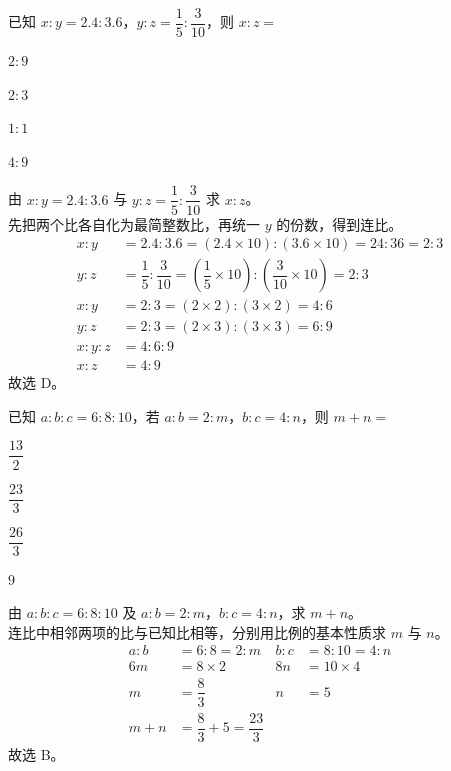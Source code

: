 \documentclass[12pt,a4paper,fontset=none]{exam-zh}
\begin{document}
\begin{question}
    已知 $x:y=2.4:3.6$，$y:z=\dfrac{1}{5}:\dfrac{3}{10}$，则 $x:z=$ \paren[D]
    \begin{choices}
        \item $2:9$
        \item $2:3$
        \item $1:1$
        \item $4:9$
    \end{choices}
\end{question}

\begin{solution}
    由 $x:y=2.4:3.6$ 与 $y:z=\dfrac{1}{5}:\dfrac{3}{10}$ 求 $x:z$。 \\
    先把两个比各自化为最简整数比，再统一 $y$ 的份数，得到连比。
    \begin{align*}
        x:y &= 2.4:3.6 = (2.4\times 10):(3.6\times 10) = 24:36 = 2:3 \\
        y:z &= \dfrac{1}{5}:\dfrac{3}{10} = \left(\dfrac{1}{5}\times 10\right):\left(\dfrac{3}{10}\times 10\right) = 2:3 \\
        x:y &= 2:3 = (2\times 2):(3\times 2) = 4:6 \\
        y:z &= 2:3 = (2\times 3):(3\times 3) = 6:9 \\
        x:y:z &= 4:6:9 \\
        x:z &= 4:9
    \end{align*}
    故选 D。
\end{solution}

\begin{question}
    已知 $a:b:c=6:8:10$，若 $a:b=2:m$，$b:c=4:n$，则 $m+n=$ \paren[B]
    \begin{choices}
        \item $\dfrac{13}{2}$
        \item $\dfrac{23}{3}$
        \item $\dfrac{26}{3}$
        \item $9$
    \end{choices}
\end{question}

\begin{solution}
    由 $a:b:c=6:8:10$ 及 $a:b=2:m$，$b:c=4:n$，求 $m+n$。 \\
    连比中相邻两项的比与已知比相等，分别用比例的基本性质求 $m$ 与 $n$。
    \begin{align*}
        a:b &= 6:8 = 2:m & b:c &= 8:10 = 4:n \\
        6m &= 8\times 2 & 8n &= 10\times 4 \\
        m &= \dfrac{8}{3} & n &= 5 \\
        m+n &= \dfrac{8}{3}+5 = \dfrac{23}{3}
    \end{align*}
    故选 B。
\end{solution}
\end{document}
